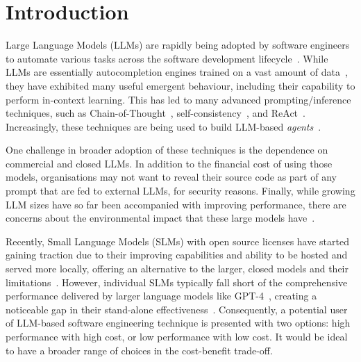 
\section{Introduction}
\label{sec:introduction}

Large Language Models (LLMs) are rapidly being adopted by software engineers to automate various tasks across the software development lifecycle~\cite{Fan2023yu}. While LLMs are essentially autocompletion engines trained on a vast amount of data~\cite{Vaswani2017aa}, they have exhibited many useful emergent behaviour, including their capability to perform in-context learning. This has led to many advanced prompting/inference techniques, such as Chain-of-Thought~\cite{Wei2024aa}, self-consistency~\cite{wang2022self}, and ReAct~\cite{Yao2022qf}. Increasingly, these techniques are being used to build LLM-based \emph{agents}~\cite{Feldt2023ax,Bouzenia2024aa,Yoon2024aa}.

One challenge in broader adoption of these techniques is the dependence on commercial and closed LLMs. In addition to the financial cost of using those models, organisations may not want to reveal their source code as part of any prompt that are fed to external LLMs, for security reasons. Finally, while growing LLM sizes have so far been accompanied with improving performance, there are concerns about the environmental impact that these large models have~\cite{Strubell2019aa,Rillig2023aa}. 


Recently, Small Language Models (SLMs) with open source licenses have started gaining traction due to their improving capabilities and ability to be hosted and served more locally, offering an alternative to the larger, closed models and their limitations~\cite{dubeyLlama3Herd2024,teamGemma2Improving2024,huiQwen25CoderTechnicalReport2024}. However, individual SLMs typically fall short of the comprehensive performance delivered by larger language models like GPT-4~\cite{achiam2023gpt}, creating a noticeable gap in their stand-alone effectiveness~\cite{Kang2024aa}. Consequently, a potential user of LLM-based software engineering technique is presented with two options: high performance with high cost, or low performance with low cost. It would be ideal to have a broader range of choices in the cost-benefit trade-off.

